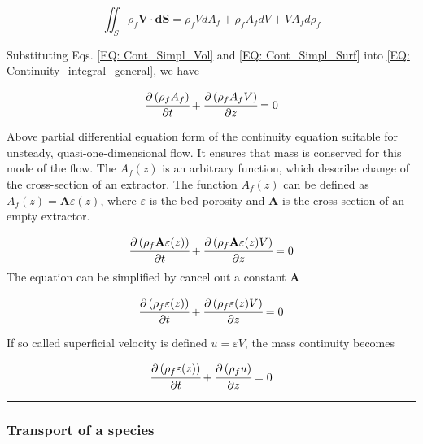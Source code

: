 \documentclass[../Parameter_fitting.tex]{subfiles}
\begin{document}
	{\footnotesize
		\begin{equation}
			\iint_S \rho_f \textbf{V} \cdot \textbf{dS} = \rho_f V dA_f + \rho_f A_f dV + V A_f d\rho_f 
			\label{EQ: Cont_Simpl_Surf}
		\end{equation}
	}

	Substituting Eqs. \ref{EQ: Cont_Simpl_Vol} and \ref{EQ: Cont_Simpl_Surf} into \ref{EQ: Continuity_integral_general}, we have
	
	{\footnotesize
		\begin{equation}
			\cfrac{\partial \left( \rho_f A_f \right)}{\partial t} + \cfrac{\partial \left( \rho_f A_f V \right)}{\partial z} = 0
		\end{equation}
	}
	
	Above partial differential equation form of the continuity equation suitable for unsteady, quasi-one-dimensional flow. It ensures that mass is conserved for this mode of the flow. The $A_f(z)$ is an arbitrary function, which describe change of the cross-section of an extractor. The function $A_f(z)$ can be defined as $A_f(z) = \textbf{A} \varepsilon(z)$, where $\varepsilon$ is the bed porosity and $\textbf{A}$ is the cross-section of an empty extractor.
	
	{\footnotesize
		\begin{equation}
			\cfrac{\partial \left( \rho_f \textbf{A} \varepsilon (z) \right)}{\partial t} + \cfrac{\partial \left( \rho_f \textbf{A} \varepsilon (z) V \right)}{\partial z} = 0
		\end{equation}
	}
	The equation can be simplified by cancel out a constant $\textbf{A}$
	
	{\footnotesize
		\begin{equation}
			\cfrac{\partial \left( \rho_f \varepsilon (z) \right)}{\partial t} + \cfrac{\partial \left( \rho_f \varepsilon (z) V \right)}{\partial z} = 0
		\end{equation}
	}
	
	If so called superficial velocity is defined $u=\varepsilon V$, the mass continuity becomes
	
	{\footnotesize
		\begin{equation}
			\cfrac{\partial \left( \rho_f \varepsilon (z) \right)}{\partial t} + \cfrac{\partial \left( \rho_f u \right)}{\partial z} = 0
			\label{EQ: Mass_Continuity}
		\end{equation}
	}
	
	\hrule
	
	\subsubsection{Transport of a species}
	
\end{document}
